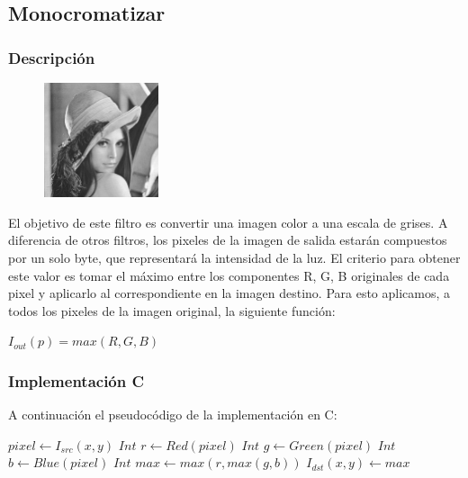 \subsection{Monocromatizar}

\subsubsection{Descripción}

\begin{figure}
	\centering
	\includegraphics[width=0.3\textwidth]{imagenes/lenaMONO.jpg}
\end{figure}

El objetivo de este filtro es convertir una imagen color a una escala de grises. A diferencia de otros filtros, los pixeles de la imagen de salida estarán compuestos por un solo byte, que representará la intensidad de la luz. El criterio para obtener este valor es tomar el máximo entre los componentes R, G, B originales de cada pixel y aplicarlo al correspondiente en la imagen destino. Para esto aplicamos, a todos los pixeles de la imagen original, la siguiente función:

\begin{center}
	$I_{out}(p) = max(R, G, B)$
\end{center}

\hfill

\subsubsection{Implementación C}

A continuación el pseudocódigo de la implementación en C:

\begin{algorithm}[H]
  \begin{algorithmic}[1]
			  \STATE $pixel \gets I_{src}(x,y)$
			  \STATE $Int$ $ r \gets Red(pixel) $
			  \STATE $Int$ $g \gets Green(pixel)$
			  \STATE $Int$ $ b \gets Blue(pixel)$
			  \STATE $Int$ $max \gets max(r, max(g, b))$
			  \STATE $I_{dst}(x,y) \gets max$
			\ENDFOR
		 \ENDFOR
  \end{algorithmic}
  \caption{$monocromatizar (I_{src}, I_{dst})$}
  \label{alg:monocromatizar}
\end{algorithm}

